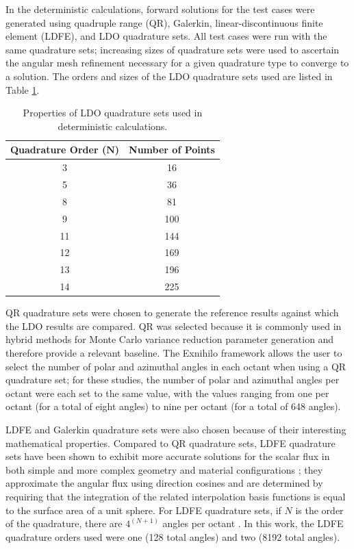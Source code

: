\documentclass{article} %
\begin{document}
In the deterministic calculations, forward solutions for the test cases were
generated using quadruple range (QR), Galerkin, linear-discontinuous finite 
element (LDFE), and LDO quadrature sets. All test cases were run with the same 
quadrature sets; increasing sizes of quadrature sets were used to ascertain the
angular mesh refinement necessary for a given quadrature type to converge to a 
solution. The orders and sizes of the LDO quadrature sets used are listed in
Table \ref{ldo-n}.

\begin{table}[!htb]
\centering
\caption{Properties of LDO quadrature sets used in deterministic calculations.}
\begin{tabular}{cc}
\multicolumn{1}{l}{\textbf{Quadrature Order ($\mathbf{N}$)}} & 
\multicolumn{1}{l}{\textbf{Number of Points}} \\
\hline
3 & 16 \\
5 & 36 \\
8 & 81 \\
9 & 100 \\
11 & 144 \\
12 & 169 \\
13 & 196 \\
14 & 225 \\
\end{tabular}
\label{ldo-n}
\end{table}

QR quadrature sets were chosen to generate the reference results against which
the LDO results are compared. QR was selected because it is commonly used 
in hybrid methods for Monte Carlo variance reduction parameter generation and 
therefore provide a relevant baseline. The Exnihilo framework allows the user
to select the number of polar and azimuthal angles in each octant when using a
QR quadrature set; for these studies, the number of polar and azimuthal angles
per octant were each set to the same value, with the values ranging from one
per octant (for a total of eight angles) to nine per octant (for a total of
648 angles). 

LDFE and Galerkin quadrature sets were also chosen because of their interesting
mathematical properties. Compared to QR quadrature sets, LDFE quadrature sets
have been shown to exhibit more accurate solutions for the scalar flux in both 
simple and more complex geometry and material configurations \cite{ldfe}; they 
approximate the angular flux using direction cosines and are determined by
requiring that the integration of the related interpolation basis functions is
equal to the surface area of a unit sphere. For LDFE quadrature sets, if $N$ is
the order of the quadrature, there are $4^{(N+1)}$ angles per octant
\cite{exum}. In this work, the LDFE quadrature orders used were one (128 total
angles) and two (8192 total angles).
\end{document}
